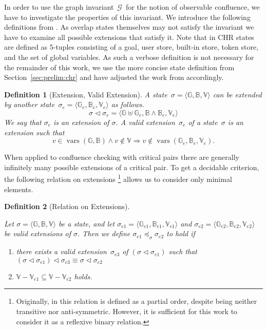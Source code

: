 \documentclass{tlp}
\newtheorem{definition}{Definition}[section]
\newcommand{\st}[3]{\ensuremath{\langle #1 , #2 , #3 \rangle}}
\newcommand{\mcG}{\ensuremath{\mathcal{G}}}
\newcommand{\bbB}{\ensuremath{\mathbb{B}}}
\newcommand{\bbG}{\ensuremath{\mathbb{G}}}
\newcommand{\bbV}{\ensuremath{\mathbb{V}}}
\newcommand{\extend}{\ensuremath{\lhd}}
\DeclareMathOperator{\vars}{vars}
\begin{document}
In order to use the graph invariant~\mcG\ for the notion of observable
confluence, we have to investigate the properties of this invariant. We introduce
the following definitions from \cite{duckstuckeysulzmann07}. As overlap states
themselves may not satisfy the invariant we have to examine all possible
extensions that satisfy it. Note that in \cite{duckstuckeysulzmann07} CHR states
are defined as 5-tuples consisting of a goal, user store, built-in store, token
store, and the set of global variables. As such a verbose definition is not
necessary for the remainder of this work, we use the more concise state
definition from Section~\ref{sec:prelim:chr} and have adjusted the work from
\cite{duckstuckeysulzmann07} accordingly.

\begin{definition}[Extension, Valid Extension] 

A state~$\sigma = \st{\bbG}{\bbB}{\bbV}$ can be \emph{extended} by another
state~$\sigma_e = \st{\bbG_e}{\bbB_e}{\bbV_e}$ as follows.\[ \sigma \extend
\sigma_e = \st{\bbG \uplus \bbG_e}{\bbB \land \bbB_e}{\bbV_e} \] We say that
$\sigma_e$ is an \emph{extension} of $\sigma$. A \emph{valid
extension}~$\sigma_e$ of a state~$\sigma$ is an extension such that\[ v \in
\vars(\bbG,\bbB) \land v \not \in \bbV \Rightarrow v \not \in \vars(\bbG_e,
\bbB_e, \bbV_e).\]
\end{definition}

When applied to confluence checking with critical pairs there are generally
infinitely many possible extensions of a critical pair. To get a decidable
criterion, the following relation on extensions \footnote{Originally, in
\cite{duckstuckeysulzmann07} this relation is defined as a partial order,
despite being neither transitive nor anti-symmetric. However, it is sufficient
for this work to consider it as a reflexive binary relation.} allows us to
consider only minimal elements.

\begin{definition}[Relation on Extensions]\label{def:partialorder}

Let $\sigma = \st{\bbG}{\bbB}{\bbV}$ be a state, and let $\sigma_{e1} =
\st{\bbG_{e1}}{\bbB_{e1}}{\bbV_{e1}}$ and $\sigma_{e2} =
\st{\bbG_{e2}}{\bbB_{e2}}{\bbV_{e2}}$ be valid extensions of $\sigma$. Then we
define $\sigma_{e1} \preceq_{\sigma} \sigma_{e2}$ to hold if
\begin{enumerate}
  \item there exists a valid extension~$\sigma_{e3}$ of $(\sigma \extend
  \sigma_{e1})$ such that $(\sigma \extend \sigma_{e1}) \extend \sigma_{e3}
  \equiv \sigma \extend \sigma_{e2}$
  \item $\bbV - \bbV_{e1} \subseteq \bbV - \bbV_{e2}$ holds.
\end{enumerate}
\end{definition}
\end{document}
